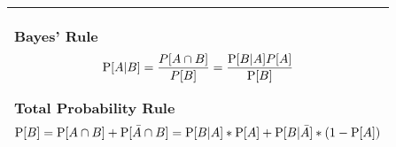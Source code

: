 {\tabulinesep=1mm
\begin{tabu}{|p{16cm} |}
\hline
\textbf{Bayes' Rule} 
\[ \P[A|B] = \frac{P[A \cap B]}{P[B]} = \frac{\P[B|A]P[A]}{\P[B]} \]

\textbf{Total Probability Rule}
\[ \P[B] = \P[A \cap B] + \P[ \bar{A} \cap B] = \P[B|A] * \P[A] + 
\P[B|\bar{A}]*(1 - \P[A])\]
\\
\hline
\end{tabu}
}
